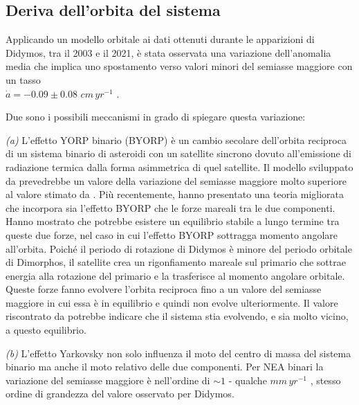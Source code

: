 \documentclass[a4paper,11pt,openright]{book}
\begin{document}
\subsection{Deriva dell'orbita del sistema}
Applicando un modello orbitale ai dati ottenuti durante le apparizioni di Didymos, tra il 2003 e il 2021, è stata osservata una variazione dell'anomalia media che implica uno spostamento verso valori minori del semiasse maggiore con un tasso \\$\dot{a}=-0.09 \pm 0.08\,\,cm\,yr^{-1}$ \citep{scheirich_preimpact_2022}. 

Due sono i possibili meccanismi in grado di spiegare questa variazione:

\qquad \textit{(a)} L'effetto YORP binario (BYORP) è un cambio secolare dell'orbita reciproca di un sistema binario di asteroidi con un satellite sincrono dovuto all'emissione di radiazione termica dalla forma asimmetrica di quel satellite. Il modello sviluppato da \citet{pravec_binary_2010} prevedrebbe un valore della variazione del semiasse maggiore molto superiore al valore stimato da \citet{scheirich_preimpact_2022}. Più recentemente, \citet{jacobson_dynamics_2011} hanno presentato una teoria migliorata che incorpora sia l'effetto BYORP che le forze mareali tra le due componenti. Hanno mostrato che potrebbe esistere un equilibrio stabile a lungo termine tra queste due forze, nel caso in cui l'effetto BYORP sottragga momento angolare all'orbita. Poiché il periodo di rotazione di Didymos è minore del periodo orbitale di Dimorphos, il satellite crea un rigonfiamento mareale sul primario che sottrae energia alla rotazione del primario e la trasferisce al momento angolare orbitale. Queste forze fanno evolvere l'orbita reciproca fino a un valore del semiasse maggiore in cui essa è in equilibrio e quindi non evolve ulteriormente. Il valore riscontrato da \citet{scheirich_preimpact_2022} potrebbe indicare che il sistema stia evolvendo, e sia molto vicino, a questo equilibrio.

\qquad \textit{(b)} L'effetto Yarkovsky non solo influenza il moto del centro di massa del sistema binario ma anche il moto relativo delle due componenti. Per NEA binari la variazione del semiasse maggiore è nell'ordine di $\sim 1$ - qualche $mm\,yr^{-1}$ \citep{scheirich_satellite_2021}, stesso ordine di grandezza del valore osservato per Didymos.
\end{document}
